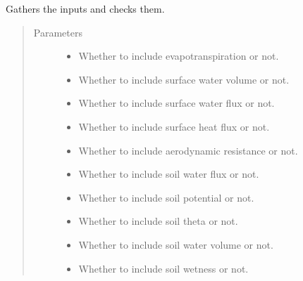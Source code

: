 \documentclass[letterpaper,10pt,english]{sphinxmanual}
\begin{document}
\begin{fulllineitems}
\begin{fulllineitems}
\label{\detokenize{cmf:livestock.components.comp_cmf.CMFOutputs.run_checks}}
Gathers the inputs and checks them.
\begin{quote}\begin{description}
\item[{Parameters}] \leavevmode\begin{itemize}
\item {} 
 \textendash{} Whether to include evapotranspiration or not.

\item {} 
 \textendash{} Whether to include surface water volume or not.

\item {} 
 \textendash{} Whether to include surface water flux or not.

\item {} 
 \textendash{} Whether to include surface heat flux or not.

\item {} 
 \textendash{} Whether to include aerodynamic resistance or not.

\item {} 
 \textendash{} Whether to include soil water flux or not.

\item {} 
 \textendash{} Whether to include soil potential or not.

\item {} 
 \textendash{} Whether to include soil theta or not.

\item {} 
 \textendash{} Whether to include soil water volume or not.

\item {} 
 \textendash{} Whether to include soil wetness or not.

\end{itemize}


\end{description}
\end{quote}
\end{fulllineitems}
\end{fulllineitems}
\end{document}
